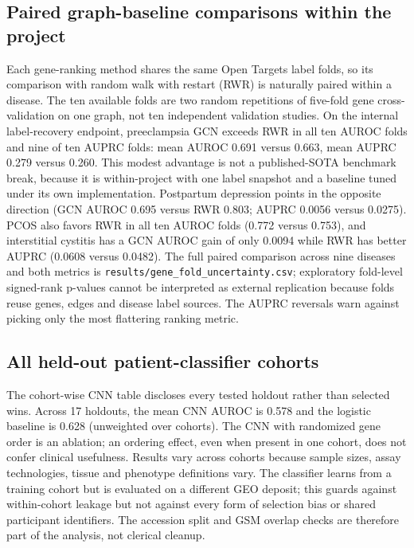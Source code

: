 \documentclass[11pt,a4paper]{article}
\begin{document}
\subsection{Paired graph-baseline comparisons within the project}
Each gene-ranking method shares the same Open Targets label folds, so its comparison with random walk with restart (RWR) is naturally paired within a disease. The ten available folds are two random repetitions of five-fold gene cross-validation on one graph, not ten independent validation studies. On the internal label-recovery endpoint, preeclampsia GCN exceeds RWR in all ten AUROC folds and nine of ten AUPRC folds: mean AUROC 0.691 versus 0.663, mean AUPRC 0.279 versus 0.260. This modest advantage is not a published-SOTA benchmark break, because it is within-project with one label snapshot and a baseline tuned under its own implementation. Postpartum depression points in the opposite direction (GCN AUROC 0.695 versus RWR 0.803; AUPRC 0.0056 versus 0.0275). PCOS also favors RWR in all ten AUROC folds (0.772 versus 0.753), and interstitial cystitis has a GCN AUROC gain of only 0.0094 while RWR has better AUPRC (0.0608 versus 0.0482). The full paired comparison across nine diseases and both metrics is \texttt{results/gene\_fold\_uncertainty.csv}; exploratory fold-level signed-rank p-values cannot be interpreted as external replication because folds reuse genes, edges and disease label sources. The AUPRC reversals warn against picking only the most flattering ranking metric.

\subsection{All held-out patient-classifier cohorts}
The cohort-wise CNN table discloses every tested holdout rather than selected wins. Across 17 holdouts, the mean CNN AUROC is 0.578 and the logistic baseline is 0.628 (unweighted over cohorts). The CNN with randomized gene order is an ablation; an ordering effect, even when present in one cohort, does not confer clinical usefulness. Results vary across cohorts because sample sizes, assay technologies, tissue and phenotype definitions vary. The classifier learns from a training cohort but is evaluated on a different GEO deposit; this guards against within-cohort leakage but not against every form of selection bias or shared participant identifiers. The accession split and GSM overlap checks are therefore part of the analysis, not clerical cleanup.

\end{document}
